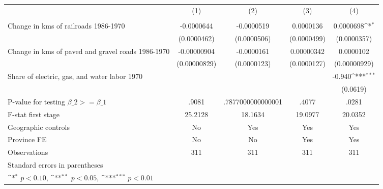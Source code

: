 {
\def\sym#1{\ifmmode^{#1}\else\(^{#1}\)\fi}
\begin{tabular}{l*{4}{c}}
\hline\hline
                &\multicolumn{1}{c}{(1)}&\multicolumn{1}{c}{(2)}&\multicolumn{1}{c}{(3)}&\multicolumn{1}{c}{(4)}\\
                &\multicolumn{1}{c}{}&\multicolumn{1}{c}{}&\multicolumn{1}{c}{}&\multicolumn{1}{c}{}\\
\hline
Change in kms of railroads 1986-1970&-0.0000644         &-0.0000519         &0.0000136         &0.0000698\sym{*}  \\
                &(0.0000462)         &(0.0000506)         &(0.0000499)         &(0.0000357)         \\
[1em]
Change in kms of paved and gravel roads 1986-1970&-0.00000904         &-0.0000161         &0.00000342         &0.0000102         \\
                &(0.00000829)         &(0.0000123)         &(0.0000127)         &(0.00000929)         \\
[1em]
Share of electric, gas, and water labor 1970&                  &                  &                  &   -0.940\sym{***}\\
                &                  &                  &                  & (0.0619)         \\
\hline
P-value for testing $\beta\_{2} >= \beta\_{1}$&    .9081         &.7877000000000001         &    .4077         &    .0281         \\
F-stat first stage&  25.2128         &  18.1634         &  19.0977         &  20.0352         \\
Geographic controls&       No         &      Yes         &      Yes         &      Yes         \\
Province FE     &       No         &       No         &      Yes         &      Yes         \\
Observations    &      311         &      311         &      311         &      311         \\
\hline\hline
\multicolumn{5}{l}{\footnotesize Standard errors in parentheses}\\
\multicolumn{5}{l}{\footnotesize \sym{*} \(p<0.10\), \sym{**} \(p<0.05\), \sym{***} \(p<0.01\)}\\
\end{tabular}
}
